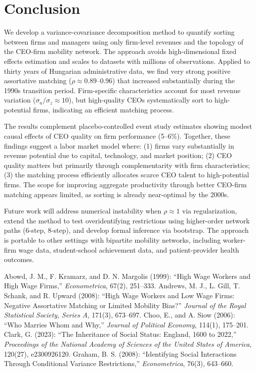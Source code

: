\documentclass[11pt]{article}
\begin{document}
\section{Conclusion}
We develop a variance-covariance decomposition method to quantify sorting between firms and managers using only firm-level revenues and the topology of the CEO-firm mobility network. The approach avoids high-dimensional fixed effects estimation and scales to datasets with millions of observations. Applied to thirty years of Hungarian administrative data, we find very strong positive assortative matching ($\rho \approx 0.89$--0.96) that increased substantially during the 1990s transition period. Firm-specific characteristics account for most revenue variation ($\sigma_a/\sigma_z \approx 10$), but high-quality CEOs systematically sort to high-potential firms, indicating an efficient matching process.

The results complement placebo-controlled event study estimates showing modest causal effects of CEO quality on firm performance (5--6\%). Together, these findings suggest a labor market model where: (1) firms vary substantially in revenue potential due to capital, technology, and market position; (2) CEO quality matters but primarily through complementarity with firm characteristics; (3) the matching process efficiently allocates scarce CEO talent to high-potential firms. The scope for improving aggregate productivity through better CEO-firm matching appears limited, as sorting is already near-optimal by the 2000s.

Future work will address numerical instability when $\rho \approx 1$ via regularization, extend the method to test overidentifying restrictions using higher-order network paths (6-step, 8-step), and develop formal inference via bootstrap. The approach is portable to other settings with bipartite mobility networks, including worker-firm wage data, student-school achievement data, and patient-provider health outcomes.


\begin{thebibliography}{9}
 Abowd, J. M., F. Kramarz, and D. N. Margolis (1999): ``High Wage Workers and High Wage Firms,'' \emph{Econometrica}, 67(2), 251--333.
 Andrews, M. J., L. Gill, T. Schank, and R. Upward (2008): ``High Wage Workers and Low Wage Firms: Negative Assortative Matching or Limited Mobility Bias?'' \emph{Journal of the Royal Statistical Society, Series A}, 171(3), 673--697.
 Choo, E., and A. Siow (2006): ``Who Marries Whom and Why,'' \emph{Journal of Political Economy}, 114(1), 175--201.
 Clark, G. (2023): ``The Inheritance of Social Status: England, 1600 to 2022,'' \emph{Proceedings of the National Academy of Sciences of the United States of America}, 120(27), e2300926120.
 Graham, B. S. (2008): ``Identifying Social Interactions Through Conditional Variance Restrictions,'' \emph{Econometrica}, 76(3), 643--660.
\end{thebibliography}
\end{document}
